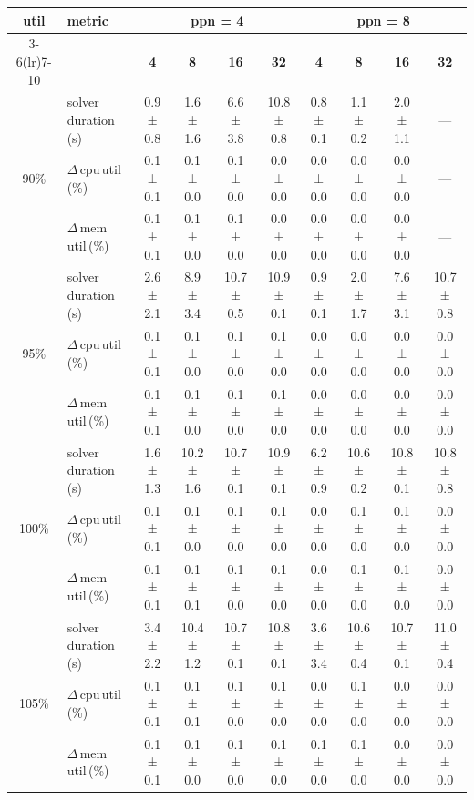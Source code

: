 \begin{tabular}{@{}c l *{8}{c}@{}}
\toprule
\multirow{2}{*}{\textbf{util}} & \multirow{2}{*}{\textbf{metric}} &\multicolumn{4}{c}{\textbf{ppn = 4}} & \multicolumn{4}{c}{\textbf{ppn = 8}}\\
\cmidrule(lr){3-6}\cmidrule(lr){7-10}
 &  & \textbf{4} & \textbf{8} & \textbf{16} & \textbf{32} & \textbf{4} & \textbf{8} & \textbf{16} & \textbf{32}\\
\midrule
\multirow{3}{*}{90\%}
& solver\,duration\,(s) & 0.9 ± 0.8 & 1.6 ± 1.6 & 6.6 ± 3.8 & 10.8 ± 0.8 & 0.8 ± 0.1 & 1.1 ± 0.2 & 2.0 ± 1.1 & \multicolumn{1}{c}{—} \\
& $\Delta$\,cpu\,util\,(\%) & 0.1 ± 0.1 & 0.1 ± 0.0 & 0.1 ± 0.0 & 0.0 ± 0.0 & 0.0 ± 0.0 & 0.0 ± 0.0 & 0.0 ± 0.0 & \multicolumn{1}{c}{—} \\
& $\Delta$\,mem\,util\,(\%) & 0.1 ± 0.1 & 0.1 ± 0.0 & 0.1 ± 0.0 & 0.0 ± 0.0 & 0.0 ± 0.0 & 0.0 ± 0.0 & 0.0 ± 0.0 & \multicolumn{1}{c}{—} \\
\midrule
\multirow{3}{*}{95\%}
& solver\,duration\,(s) & 2.6 ± 2.1 & 8.9 ± 3.4 & 10.7 ± 0.5 & 10.9 ± 0.1 & 0.9 ± 0.1 & 2.0 ± 1.7 & 7.6 ± 3.1 & 10.7 ± 0.8 \\
& $\Delta$\,cpu\,util\,(\%) & 0.1 ± 0.1 & 0.1 ± 0.0 & 0.1 ± 0.0 & 0.1 ± 0.0 & 0.0 ± 0.0 & 0.0 ± 0.0 & 0.0 ± 0.0 & 0.0 ± 0.0 \\
& $\Delta$\,mem\,util\,(\%) & 0.1 ± 0.1 & 0.1 ± 0.0 & 0.1 ± 0.0 & 0.1 ± 0.0 & 0.0 ± 0.0 & 0.0 ± 0.0 & 0.0 ± 0.0 & 0.0 ± 0.0 \\
\midrule
\multirow{3}{*}{100\%}
& solver\,duration\,(s) & 1.6 ± 1.3 & 10.2 ± 1.6 & 10.7 ± 0.1 & 10.9 ± 0.1 & 6.2 ± 0.9 & 10.6 ± 0.2 & 10.8 ± 0.1 & 10.8 ± 0.8 \\
& $\Delta$\,cpu\,util\,(\%) & 0.1 ± 0.1 & 0.1 ± 0.0 & 0.1 ± 0.0 & 0.1 ± 0.0 & 0.0 ± 0.0 & 0.1 ± 0.0 & 0.1 ± 0.0 & 0.0 ± 0.0 \\
& $\Delta$\,mem\,util\,(\%) & 0.1 ± 0.1 & 0.1 ± 0.1 & 0.1 ± 0.0 & 0.1 ± 0.0 & 0.0 ± 0.0 & 0.1 ± 0.0 & 0.1 ± 0.0 & 0.0 ± 0.0 \\
\midrule
\multirow{3}{*}{105\%}
& solver\,duration\,(s) & 3.4 ± 2.2 & 10.4 ± 1.2 & 10.7 ± 0.1 & 10.8 ± 0.1 & 3.6 ± 3.4 & 10.6 ± 0.4 & 10.7 ± 0.1 & 11.0 ± 0.4 \\
& $\Delta$\,cpu\,util\,(\%) & 0.1 ± 0.1 & 0.1 ± 0.1 & 0.1 ± 0.0 & 0.1 ± 0.0 & 0.0 ± 0.0 & 0.1 ± 0.0 & 0.0 ± 0.0 & 0.0 ± 0.0 \\
& $\Delta$\,mem\,util\,(\%) & 0.1 ± 0.1 & 0.1 ± 0.0 & 0.1 ± 0.0 & 0.1 ± 0.0 & 0.1 ± 0.0 & 0.1 ± 0.0 & 0.0 ± 0.0 & 0.0 ± 0.0 \\
\bottomrule
\end{tabular}
